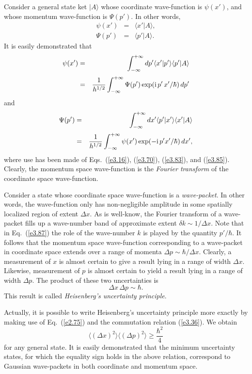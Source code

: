 Consider a general state ket $|A\rangle$ whose coordinate wave-function is $\psi(x')$,
and whose momentum wave-function is $\Psi(p')$. In other words,
\begin{eqnarray}
\psi(x') &= &\langle x'|A\rangle, \\[0.5ex]
\Psi(p') &=& \langle p'|A\rangle.
\end{eqnarray}
It is easily demonstrated that
\begin{eqnarray}
\psi(x') &=& \int_{-\infty}^{+\infty} dp' \langle x'|p'\rangle \langle p'|A\rangle
\nonumber\\[0.5ex]
&= &\frac{1}{h^{1/2}} \int_{-\infty}^{+\infty} \Psi(p') 
\exp({\rm i} \,p'\,x'/\hbar)\,dp'\label{e3.87}
\end{eqnarray}
and 
\begin{eqnarray}
\Psi(p') &=& \int_{-\infty}^{+\infty} dx' \langle p'|x'\rangle \langle x'|A\rangle
\nonumber\\[0.5ex]
&=& \frac{1}{h^{1/2}} \int_{-\infty}^{+\infty} \psi(x') \exp(-{\rm i}\, p' x'/\hbar)\,
dx',
\end{eqnarray}
where use has been made of Eqs.~(\ref{e3.16}), (\ref{e3.70}), (\ref{e3.83}), and (\ref{e3.85}). 
Clearly, the momentum
space wave-function is the {\em Fourier transform}
 of the coordinate space wave-function. 

Consider a state whose coordinate space wave-function is a {\em wave-packet}. 
In other words, the wave-function only has non-negligible amplitude in some
spatially localized region of extent $\Delta x$. As is well-know, the Fourier
transform of a wave-packet fills up a wave-number band of approximate extent
$\delta k \sim 1/\Delta x$. Note that in Eq.~(\ref{e3.87}) the role of the wave-number
$k$ is played by the quantity $p'/\hbar$. It follows that the momentum space
wave-function corresponding to a wave-packet in coordinate space extends over
a range of momenta $\Delta p \sim \hbar /\Delta x$. Clearly, a measurement 
of $x$ is almost certain to give a result lying in a
range of width $\Delta x$. Likewise, measurement of $p$ is almost certain to
yield a result lying in a range of width $\Delta p$. The product of these two
uncertainties is 
\begin{equation}
\Delta x \,\Delta p \sim \hbar.
\end{equation}
This result is called {\em Heisenberg's uncertainty principle}. 

Actually, it is possible to write Heisenberg's uncertainty principle
 more exactly by making use of
Eq.~(\ref{e2.75}) and the commutation relation (\ref{e3.36}). We obtain
\begin{equation}
\langle (\Delta x)^2\rangle \langle (\Delta p)^2\rangle \geq \frac{\hbar^2}{4}
\end{equation}
for any general state. It is easily demonstrated that the minimum uncertainty states,
for which the equality sign holds in the above relation, correspond to Gaussian
wave-packets in both coordinate and momentum space. 

